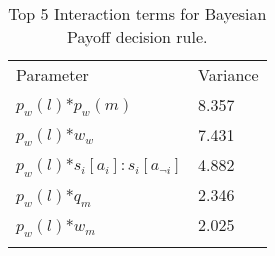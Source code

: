 \begin{table}[H]
\caption{Top 5 Interaction terms for Bayesian Payoff decision rule. \label{tab:sa_interaction_payoff_sig_iqr}}
\begin{tabular} {ll}
\hline\noalign{\smallskip}
Parameter & Variance \\
\noalign{\smallskip}\svhline\noalign{\smallskip}
\(p_{w}(l)\)*\(p_{w}(m)\) & 8.357\\
\(p_{w}(l)\)*\(w_{w}\) & 7.431\\
\(p_{w}(l)\)*\(s_{i}[a_{i}]:s_{i}[a_{\neg i}]\) & 4.882\\
\(p_{w}(l)\)*\(q_{m}\) & 2.346\\
\(p_{w}(l)\)*\(w_{m}\) & 2.025\\ 
\noalign{\smallskip}\hline\noalign{\smallskip}
\end{tabular}
\end{table}

